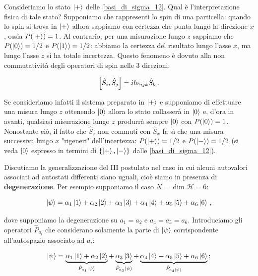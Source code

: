 \begin{esempio}
    Consideriamo lo stato $\ket{+}$ delle \eqref{basi_di_sigma_12}. Qual è l'interpretazione fisica di tale stato? Supponiamo che rappresenti lo spin di una particella: quando lo spin si trova in $\ket{+}$ allora sappiamo con certezza che punta lungo la direzione $x$, ossia $P(\ket{+}) = 1$. Al contrario, per una misurazione lungo $z$ sappiamo che $P(\ket{0}) = 1/2$ e $P(\ket{1}) = 1/2$: abbiamo la certezza del risultato lungo l'asse $x$, ma lungo l'asse $z$ si ha totale incertezza. Questo fenomeno è dovuto alla non commutatività degli operatori di spin nelle 3 direzioni:
    
    \begin{equation*}
        \comm{\hat{S}_i}{\hat{S}_j} = i \hbar \varepsilon_{ijk} \hat{S}_k \, .
    \end{equation*}
    
    \noindent Se consideriamo infatti il sistema preparato in $\ket{+}$ e supponiamo di effettuare una misura lungo $z$ ottenendo $\ket{0}$ allora lo stato collasserà in $\ket{0}$ e, d'ora in avanti, qualsiasi misurazione lungo $z$ produrrà sempre $\ket{0}$ con $P(\ket{0}) = 1$. Nonostante ciò, il fatto che $\hat{S}_z$ non commuti con $\hat{S}_x$ fa sì che una misura successiva lungo $x$ "rigeneri" dell'incertezza: $P(\ket{+}) = 1/2$ e $P(\ket{-}) = 1/2$ (si veda $\ket{0}$ espresso in termini di $\lbrace \ket{+}, \ket{-} \rbrace$ dalle \eqref{basi_di_sigma_12}). 
\end{esempio}

\noindent Discutiamo la generalizzazione del III postulato nel caso in cui alcuni autovalori associati ad autostati differenti siano uguali, cioè siamo in presenza di \textbf{degenerazione}. Per esempio supponiamo il caso $N = \dim \mathcal{H} = 6$: 

\begin{equation*}
    \ket \psi = \alpha_1 \ket 1 + \alpha_2 \ket 2 + \alpha_3 \ket 3 + \alpha_4 \ket 4 + \alpha_5 \ket 5 + \alpha_6 \ket 6 \, , 
\end{equation*}

\noindent dove supponiamo la degenerazione su $a_1 = a_2$ e $a_4 = a_5 = a_6$. Introduciamo gli operatori $\hat{P}_{a_i}$ che considerano solamente la parte di $\ket{\psi}$ corrispondente all'autospazio associato ad $a_i$:

\begin{equation*}
    \ket \psi = \underbrace{\alpha_1 \ket 1 + \alpha_2 \ket 2 }_{\hat P_{a_1} \ket \psi} + \underbrace{\alpha_3 \ket 3}_{\hat P_{a_3} \ket \psi} + \underbrace{\alpha_4 \ket 4 + \alpha_5 \ket 5 + \alpha_6 \ket 6}_{\hat P_{a_4 \ket \psi}} \, ;
\end{equation*}

